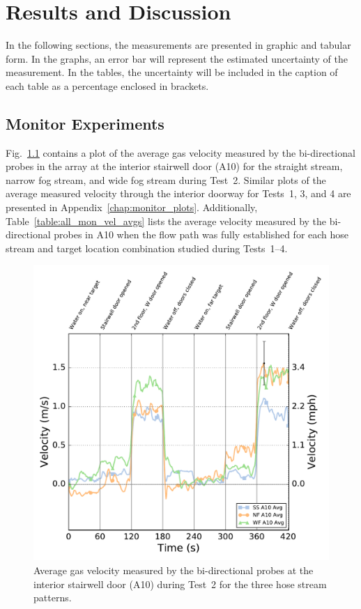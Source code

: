 \documentclass[12pt,oneside]{book}
\begin{document}
\chapter{Results and Discussion}
\label{chap:results}
In the following sections, the measurements are presented in graphic and tabular form. In the graphs, an error bar will represent the estimated uncertainty of the measurement. In the tables, the uncertainty will be included in the caption of each table as a percentage enclosed in brackets.

\section{Monitor Experiments}
\label{sec:monitor_results}
Fig.~\ref{fig:Test_2_BDP_A10_Avg_All} contains a plot of the average gas velocity measured by the bi-directional probes in the array at the interior stairwell door (A10) for the straight stream, narrow fog stream, and wide fog stream during Test~2. Similar plots of the average measured velocity through the interior doorway for Tests~1, 3, and 4 are presented in Appendix~\ref{chap:monitor_plots}. Additionally, Table~\ref{table:all_mon_vel_avgs} lists the average velocity measured by the bi-directional probes in A10 when the flow path was fully established for each hose stream and target location combination studied during Tests~1--4.

\begin{figure}[!ht]
	\includegraphics[width=\columnwidth]{../Figures/Plots/Test_16_West_063014_BDP_A10_stream_avgs}
	\caption[Average gas velocity through the interior stairwell door during Test~2 for the three hose stream patterns.]{Average gas velocity measured by the bi-directional probes at the interior stairwell door (A10) during Test~2 for the three hose stream patterns.}
	\label{fig:Test_2_BDP_A10_Avg_All}
\end{figure}
\end{document}
